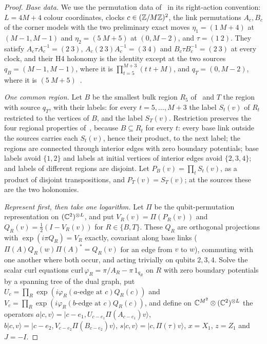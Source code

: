 \begin{proof}
\emph{Base data.} We use the permutation data of~\cite[\S6]{DM-H3} in its right-action convention: $L=4M+4$ colour coordinates,
clocks $c\in(\mathbb Z/M\mathbb Z)^2$, the link permutations $A_c,B_c$ of the corner models with the two preliminary exact moves
$\eta_1=(1\ M{+}4)$ at $(M-1,M-1)$ and $\eta_2=(5\ M{+}5)$ at $(0,M-2)$, and $\tau=(1\ 2)$. They satisfy $A_c\tau A_c^{-1}=(2\ 3)$,
$A_c(2\ 3)A_c^{-1}=(3\ 4)$ and $B_c\tau B_c^{-1}=(2\ 3)$ at every clock, and their H4 holonomy is the identity except at the two
sources $q_B=(M-1,M-1)$, where it is $\prod_{t=5}^{M+3}(t\ t{+}M)$, and $q_T=(0,M-2)$, where it is $(5\ M{+}5)$~\cite[proofs of
Propositions~6.1 and~6.5]{DM-H3}.

\emph{One common region.} Let $B$ be the smallest bulk region $R_5$ of~\cite[proof of Proposition~6.5]{DM-H3} and $T$ the region with
source $q_T$, with their labels: for every $t=5,\dots,M+3$ the label $S_t(v)$ of $R_t$ restricted to the vertices of $B$, and the
label $S_T(v)$. Restriction preserves the four regional properties of~\cite[Lemma~6.4]{DM-H3}, because $B\subseteq R_t$ for every $t$: every
base link outside the sources carries each $S_t(v)$, hence their product, to the next label; the regions are connected through
interior edges with zero boundary potentials; base labels avoid $\{1,2\}$ and labels at initial vertices of interior edges avoid
$\{2,3,4\}$; and labels of different regions are disjoint. Let $P_B(v)=\prod_tS_t(v)$, as a product of disjoint transpositions, and
$P_T(v)=S_T(v)$; at the sources these are the two holonomies.

\emph{Represent first, then take one logarithm.} Let $\Pi$ be the qubit-permutation representation on $(\mathbb C^2)^{\otimes L}$, and put
$V_R(v)=\Pi(P_R(v))$ and $Q_R(v)=\frac12(I-V_R(v))$ for $R\in\{B,T\}$. These $Q_R$ are orthogonal projections with
$\exp(i\pi Q_R)=V_R$ exactly, covariant along base links ($\Pi(A)Q_R(w)\Pi(A)^*=Q_R(v)$ for an edge from $v$ to $w$), commuting with
one another where both occur, and acting trivially on qubits $2,3,4$. Solve the scalar curl equations
$\mathrm{curl}\,\varphi_R=\pi/A_R-\pi\,1_{q_R}$ on $R$ with zero boundary potentials by a spanning tree of the dual graph, put
$U_c=\prod_R\exp(i\varphi_R(\text{$a$-edge at }c)Q_R(c))$ and $V_c=\prod_R\exp(i\varphi_R(\text{$b$-edge at }c)Q_R(c))$, and define on
$\mathbb C^{M^2}\otimes(\mathbb C^2)^{\otimes L}$ the operators $a|c,v\rangle=|c-e_1,U_{c-e_1}\Pi(A_{c-e_1})v\rangle$,
$b|c,v\rangle=|c-e_2,V_{c-e_2}\Pi(B_{c-e_2})v\rangle$, $s|c,v\rangle=|c,\Pi(\tau)v\rangle$, $x=X_1$, $z=Z_1$ and $J=-I$.


\end{proof}
